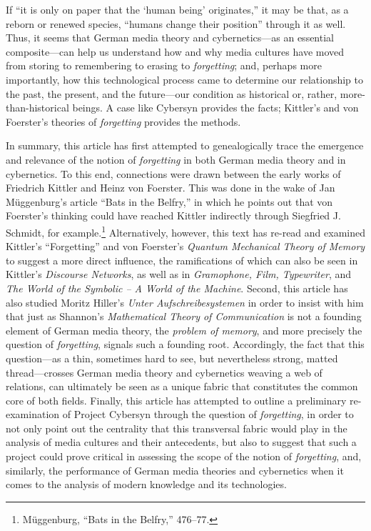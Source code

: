 \documentclass{tufte-handout}
\begin{document}
If ``it is only on paper that the `human being' originates,'' it may be
that, as a reborn or renewed species, ``humans change their position''
through it as well. Thus, it seems that German media theory and
cybernetics---as an essential composite---can help us understand how and
why media cultures have moved from storing to remembering to erasing to
\emph{forgetting}; and, perhaps more importantly, how this technological
process came to determine our relationship to the past, the present, and
the future---our condition as historical or, rather,\newpage\noindent
more-than-historical beings. A case like Cybersyn provides the facts;
Kittler's and von Foerster's theories of \emph{forgetting} provides the
methods.



In summary, this article has first attempted to genealogically trace the
emergence and relevance of the notion of \emph{forgetting} in both
German media theory and in cybernetics. To this end, connections were
drawn between the early works of Friedrich Kittler and Heinz von
Foerster. This was done in the wake of Jan Müggenburg's article ``Bats
in the Belfry,'' in which he points out that von Foerster's thinking
could have reached Kittler indirectly through Siegfried J. Schmidt, for
example.\footnote{Müggenburg, ``Bats in the Belfry,'' 476--77.}
Alternatively, however, this text has re-read and examined Kittler's
``Forgetting'' and von Foerster's \emph{Quantum Mechanical Theory of
Memory} to suggest a more direct influence, the ramifications of which
can also be seen in Kittler's \emph{Discourse Networks}, as well as in
\emph{Gramophone, Film, Typewriter}, and \emph{The World of the Symbolic
-- A World of the Machine}. Second, this article has also studied Moritz
Hiller's \emph{Unter Aufschreibesystemen} in order to insist with him
that just as Shannon's \emph{Mathematical Theory of Communication} is
not a founding element of German media theory, the \emph{problem of
memory}, and more precisely the question of \emph{forgetting}, signals
such a founding root. Accordingly, the fact that this question---as a
thin, sometimes hard to see, but nevertheless strong, matted
thread---crosses German media theory and cybernetics weaving a web of
relations, can ultimately be seen as a unique fabric that constitutes
the common core of both fields. Finally, this article has attempted to
outline a preliminary re-examination of Project Cybersyn through the
question of \emph{forgetting}, in order to not only point out the
centrality that this transversal fabric would play in the analysis of
media cultures and their antecedents, but also to suggest that such a
project could prove critical in assessing the scope of the notion of
\emph{forgetting}, and, similarly, the performance of German media
theories and cybernetics when it comes to the analysis of modern
knowledge and its technologies.
\end{document}
